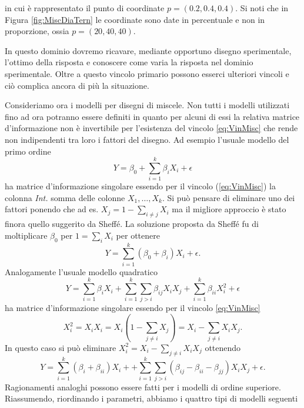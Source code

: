 \documentclass[
  11pt,
]{book}
\begin{document}
in cui è rappresentato il punto di coordinate \(p=(0.2,0.4,0.4)\). Si noti che in Figura \ref{fig:MiscDiaTern} le coordinate sono date in percentuale e non in proporzione, ossia \(p=(20,40,40)\).

In questo dominio dovremo ricavare, mediante opportuno disegno sperimentale, l'ottimo della risposta e conoscere come varia la risposta nel dominio sperimentale.
Oltre a questo vincolo primario possono esserci ulteriori vincoli e ciò complica ancora di più la situazione.

Consideriamo ora i modelli per disegni di miscele. Non tutti i modelli utilizzati fino ad ora potranno essere definiti in quanto per alcuni di essi la relativa matrice d'informazione non è invertibile per l'esistenza del vincolo \eqref{eq:VinMisc} che rende non indipendenti tra loro i fattori del disegno.
Ad esempio l'usuale modello del primo ordine
\begin{equation*}
    Y=\beta_0+\sum_{i=1}^k\beta_iX_i+\epsilon
\end{equation*}
ha matrice d'informazione singolare essendo per il vincolo (\ref{eq:VinMisc}) la colonna \emph{Int.} somma delle colonne \(X_1,\dots,X_k\). Si può pensare di eliminare uno dei fattori ponendo che ad es. \(X_j=1-\sum_{i\neq j}X_i\) ma il migliore approccio è stato finora quello suggerito da Sheffé. La soluzione proposta da Sheffé fu di moltiplicare \(\beta_0\) per \(1=\sum_iX_i\) per ottenere
\begin{equation*}
    Y=\sum_{i=1}^k(\beta_0+\beta_i)X_i+\epsilon.
\end{equation*}
Analogamente l'usuale modello quadratico
\begin{equation*}
    Y=\sum_{i=1}^k\beta_iX_i+\sum_{i=1}^k\sum_{j>i}\beta_{ij}X_iX_j+\sum_{i=1}^k\beta_{ii}X_i^2+
    \epsilon
\end{equation*}
ha matrice d'informazione singolare essendo per il vincolo \eqref{eq:VinMisc}
\begin{equation*}
    X_i^2=X_iX_i=X_i(1-\sum_{j\neq i}X_j)=X_i-\sum_{j\neq i}X_iX_j.
\end{equation*}
In questo caso si può eliminare
\(X_i^2=X_i-\sum_{j\neq i}X_iX_j\) ottenendo
\begin{equation*}
    Y=\sum_{i=1}^k(\beta_i+\beta_{ii})X_i++\sum_{i=1}^k\sum_{j>i}(\beta_{ij}-\beta_{ii}-\beta_{jj})X_iX_j
    +\epsilon.
\end{equation*}
Ragionamenti analoghi possono essere fatti per i modelli di ordine superiore.
Riassumendo, riordinando i parametri, abbiamo i quattro tipi di modelli seguenti
\end{document}
